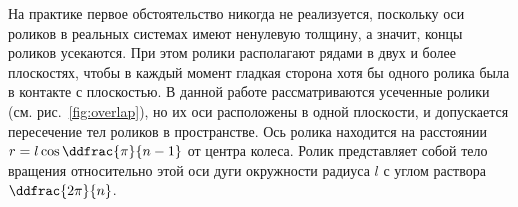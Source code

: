 На практике первое обстоятельство никогда не реализуется, поскольку оси роликов в реальных системах имеют ненулевую толщину, а значит, концы роликов усекаются. При этом ролики располагают рядами в двух и более плоскостях, чтобы в каждый момент гладкая сторона хотя бы одного ролика была в контакте с плоскостью. В данной работе рассматриваются усеченные ролики (см. рис.~\ref{fig:overlap}), но их оси расположены в одной плоскости, и допускается пересечение тел роликов в пространстве. Ось ролика находится на расстоянии $r = l\cos\ddfrac{\pi}{n-1}$ от центра колеса. Ролик представляет собой тело вращения относительно этой оси дуги окружности радиуса $l$ с углом раствора $\ddfrac{2\pi}{n}$.